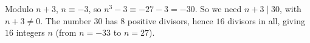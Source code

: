 Modulo $n+3$, $n\equiv-3$, so $n^3-3\equiv-27-3=-30$. So we need $n+3\mid30$, with $n+3\ne0$. The number $30$ has $8$ positive divisors, hence $16$ divisors in all, giving $\boxed{16}$ integers $n$ (from $n=-33$ to $n=27$).
